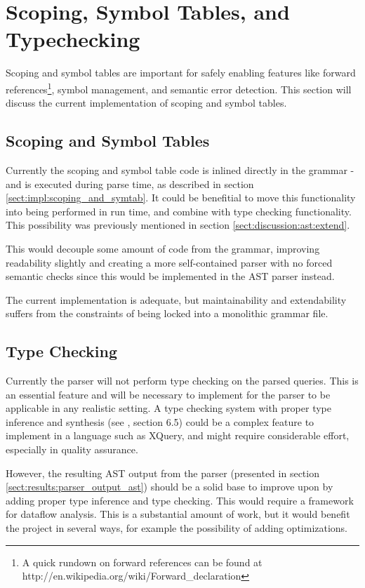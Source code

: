 \section{Scoping, Symbol Tables, and Typechecking}
Scoping and symbol tables are important for safely enabling features like
forward references\footnote{A quick rundown on forward references can be found
at http://en.wikipedia.org/wiki/Forward\_declaration},
symbol management, and semantic error detection. This section will discuss the
current implementation of scoping and symbol tables.

\subsection{Scoping and Symbol Tables}
\label{sect:discussion:scoping_and_symtab}
Currently the scoping and symbol table code is inlined directly in the grammar -
and is executed during parse time, as described in section
\ref{sect:impl:scoping_and_symtab}. It could be benefitial to move this
functionality into being performed in run time, and combine with type checking
functionality. This possibility was previously mentioned in section
\ref{sect:discussion:ast:extend}.

This would decouple some amount of code from the grammar, improving readability
slightly and creating a more self-contained parser with no forced semantic
checks since this would be implemented in the AST parser instead.

The current implementation is adequate, but maintainability and extendability
suffers from the constraints of being locked into a monolithic grammar file.

\subsection{Type Checking}
Currently the parser will not perform type checking on the parsed queries. This
is an essential feature and will be necessary to implement for the parser to be
applicable in any realistic setting. A type checking system with proper type
inference and synthesis (see \cite{compiler_tech}, section 6.5) could be a
complex feature to implement in a language such as XQuery, and might require
considerable effort, especially in quality assurance. 

However, the resulting AST output from the parser (presented in section
\ref{sect:results:parser_output_ast}) should be a solid base to improve upon by
adding proper type inference and type checking. This would require a framework
for dataflow analysis. This is a substantial amount of work, but it would
benefit the project in several ways, for example the possibility of adding
optimizations.